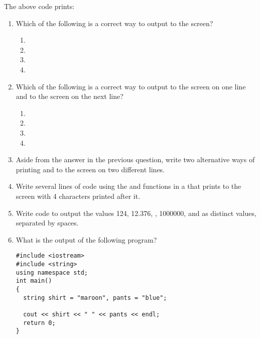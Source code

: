 \noindent The above code prints:

\noindent {}

\noindent {}

\noindent {}

\begin{enumerate}
	\item Which of the following is a correct way to output  to the screen?
	  \begin{enumerate}
	  \item {}
	  \item {}
	  \item {}
	  \item {}
	  \end{enumerate}
  \item Which of the following is a correct way to output  to the screen on one line and  to the screen on the next line?
		\begin{enumerate}
		\item {}
		\item {}
		\item {}
		\item {}
		\end{enumerate}
  \item Aside from the answer in the previous question, write two alternative ways of printing  and  to the screen on two different lines.
	\item Write several lines of code using the  and  functions in a  that prints  to the screen with 4  characters printed after it.
	\item Write code to output the values 124, 12.376, , 1000000, and  as distinct values, separated by spaces.
	\item What is the output of the following program?

\noindent\begin{minipage}{\linewidth}\begin{lstlisting}
#include <iostream>
#include <string>
using namespace std;
int main()
{
  string shirt = "maroon", pants = "blue";

  cout << shirt << " " << pants << endl;
  return 0;
}
\end{lstlisting}\end{minipage}

\end{enumerate}

